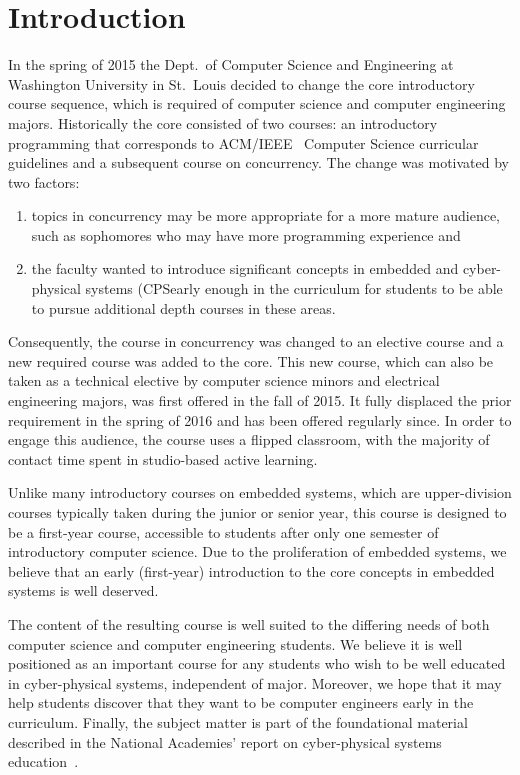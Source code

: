 \section{Introduction}
\label{sec:intro}

In the spring of 2015 the Dept.~of Computer Science and Engineering at Washington University in St.~Louis decided to change the core introductory course sequence, which is required of computer science and computer engineering majors.  Historically the core  consisted of two courses: an introductory programming that corresponds to ACM/IEEE~\cite{cs13} Computer Science curricular guidelines and a subsequent course on concurrency.  The change was motivated by two factors:
\begin{enumerate}
  \item topics in concurrency may be more appropriate for a more mature audience, such as sophomores who may have more programming experience and
  \item the faculty wanted to introduce significant concepts in embedded and cyber-physical systems (CPSearly enough in the curriculum for students to be able to pursue additional depth courses in these areas.
\end{enumerate}

Consequently, the course in concurrency was changed to an elective course and a new required course was added to the core.  This new course, which can also be taken as a technical elective by computer science minors and electrical engineering majors, was first offered in the fall of 2015.  It fully displaced the prior requirement in the spring of 2016 and has been offered regularly since.  In order to engage this audience, the course uses a flipped classroom, with the majority of contact time spent in studio-based active learning.

Unlike many introductory courses on embedded systems, which are upper-division courses typically taken during the junior or senior year, this course is designed to be a first-year course, accessible to students after only one semester of introductory computer science.  Due to the proliferation of embedded systems, we believe that an early (first-year) introduction to the core concepts in embedded systems is well deserved.

The content of the resulting course is well suited to the differing needs of both computer science and computer engineering students.  We believe it is well positioned as an important course for any students who wish to be well educated in cyber-physical systems, independent of major. Moreover, we hope that it may help students discover that they want to be computer engineers early in the curriculum. Finally, the subject matter is part of the foundational material described in the National Academies' report on cyber-physical systems education~\cite{nasem16}.

